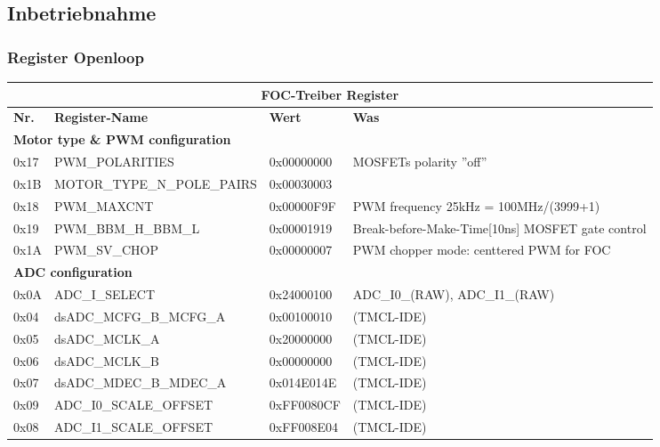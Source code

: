 \subsection{Inbetriebnahme}

\subsubsection{Register Openloop}\label{Appendix:TMC4671_Register}

\begin{table}[H]
\begin{tabularx}{\textwidth}{|l|l|l|X|}
\hline
\multicolumn{4}{|c|}{\textbf{FOC-Treiber Register}}               \\ \hline
\textbf{Nr. }& \textbf{Register-Name   }   & \textbf{Wert }      & \textbf{Was} \\ \hline
\multicolumn{4}{|l|}{\textbf{Motor type \&  PWM configuration}}        \\ \hline
0x17         & PWM\_POLARITIES             & 0x00000000 & MOSFETs polarity ''off''    \\ \hline
0x1B         & MOTOR\_TYPE\_N\_POLE\_PAIRS & 0x00030003 &     \\ \hline
0x18         & PWM\_MAXCNT                 & 0x00000F9F & PWM frequency 25kHz = 100MHz/(3999+1)   \\ \hline
0x19         & PWM\_BBM\_H\_BBM\_L         & 0x00001919 & Break-before-Make-Time[10ns] MOSFET gate control \\ \hline
0x1A         & PWM\_SV\_CHOP               & 0x00000007 & PWM chopper mode: centtered PWM for FOC \\ \hline
\multicolumn{4}{|l|}{\textbf{ADC configuration}}                       \\ \hline
0x0A         & ADC\_I\_SELECT              & 0x24000100 & ADC\_I0\_(RAW), ADC\_I1\_(RAW)    \\ \hline
0x04         & dsADC\_MCFG\_B\_MCFG\_A     & 0x00100010 & (TMCL-IDE)    \\ \hline
0x05         & dsADC\_MCLK\_A              & 0x20000000 & (TMCL-IDE)    \\ \hline
0x06         & dsADC\_MCLK\_B              & 0x00000000 & (TMCL-IDE)    \\ \hline
0x07         & dsADC\_MDEC\_B\_MDEC\_A     & 0x014E014E & (TMCL-IDE)    \\ \hline
0x09         & ADC\_I0\_SCALE\_OFFSET      & 0xFF0080CF & (TMCL-IDE)    \\ \hline
0x08         & ADC\_I1\_SCALE\_OFFSET      & 0xFF008E04 & (TMCL-IDE)    \\ \hline

\end{tabularx}
\end{table}
